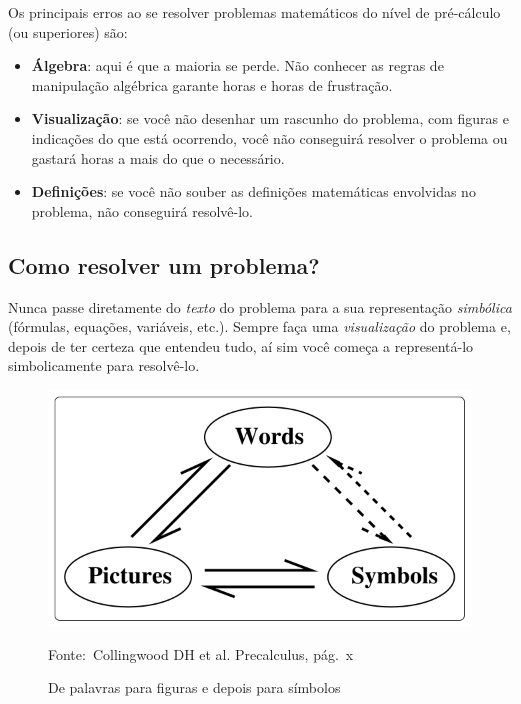 \documentclass[pdftex, brazil, 12pt, twoside]{article}
\begin{document}
Os principais erros ao se resolver problemas matemáticos do nível de pré-cálculo
(ou superiores) são:

\begin{itemize}
\item \textbf{Álgebra}: aqui é que a maioria se perde. Não conhecer as regras de
  manipulação algébrica garante horas e horas de frustração.
\item \textbf{Visualização}: se você não desenhar um rascunho do problema, com
  figuras e indicações do que está ocorrendo, você não conseguirá resolver o problema
  ou gastará horas a mais do que o necessário.
\item \textbf{Definições}: se você não souber as definições matemáticas envolvidas
  no problema, não conseguirá resolvê-lo.
\end{itemize}

\subsection{Como resolver um problema?}
\label{notas-como-resolver}

Nunca passe diretamente do \emph{texto} do problema para a sua representação
\emph{simbólica} (fórmulas, equações, variáveis, etc.). Sempre faça uma
\emph{visualização} do problema e, depois de ter certeza que entendeu tudo,
aí sim você começa a representá-lo simbolicamente para resolvê-lo.

\begin{figure}[ht]
  \begin{center}
    \caption{De palavras para figuras e depois para símbolos}
    \label{fig:palavras-imagens-simbolos}
    \includegraphics[scale=0.4]{imagens/palavras-imagens-simbolos.png}
    
    \footnotesize{Fonte:~Collingwood DH et al. Precalculus, pág.\ x}
  \end{center}
\end{figure}
\end{document}
